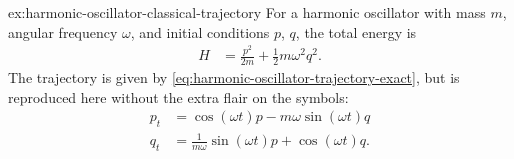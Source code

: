 \begin{DefAnswer}{ex:harmonic-oscillator-classical-trajectory}
	For a harmonic oscillator with mass $m$, angular frequency $\omega$, and initial conditions $p$, $q$, the total energy is
	\begin{align}
		H
		&= \frac{p^2}{2 m} + \frac{1}{2} m \omega^2 q^2.
	\end{align}
	The trajectory is given by \vref{eq:harmonic-oscillator-trajectory-exact}, but is reproduced here without the extra flair on the symbols:
	\begin{subequations}
	\begin{align}
		p_t
		&= \cos{(\omega t)} p - m \omega \sin{(\omega t)} q \\
		q_t
		&= \frac{1}{m \omega} \sin{(\omega t)} p + \cos{(\omega t)} q.
	\end{align}
	\end{subequations}


\end{DefAnswer}
